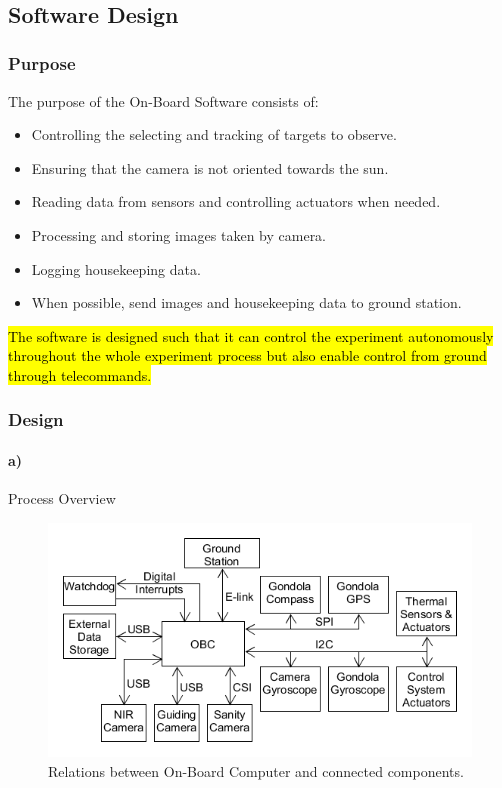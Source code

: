 $  $\pagebreak
\subsection{Software Design}

\subsubsection{Purpose}

The purpose of the On-Board Software consists of:
\begin{itemize}
	\item Controlling the selecting and tracking of targets to observe.
	\item Ensuring that the camera is not oriented towards the sun.
	\item Reading data from sensors and controlling actuators when needed.
	\item Processing and storing images taken by camera.
	\item Logging housekeeping data.
	\item When possible, send images and housekeeping data to ground station.
\end{itemize}

\hl{The software is designed such that it can control the experiment autonomously throughout the whole experiment process but also enable control from ground through telecommands.}

\subsubsection{Design}

\paragraph{a)} Process Overview

\begin{figure}[H]
	\centering
	\includegraphics[width=\textwidth]{4-experiment-design/img/software/process-overview.png}
	\caption{Relations between On-Board Computer and connected components.}
	\label{fig:software-process-overview}
\end{figure}

